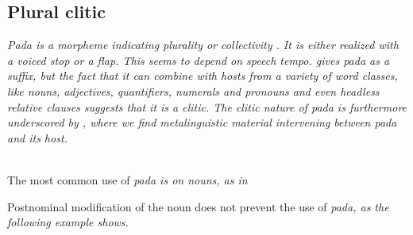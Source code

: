 \subsection{Plural clitic}\label{sec:morph:Pluralclitic}
\em Pada \em is a morpheme indicating plurality or collectivity . It is either realized with a voiced stop or a flap. This seems to depend on speech tempo.
\citet[14]{Ansaldo2005ms} gives \em pada \em as a suffix, but the fact that it can combine with hosts from a variety of word classes, like  nouns, adjectives, quantifiers, numerals and pronouns and even headless relative clauses suggests that it is a clitic. The clitic nature of \em pada \em is furthermore underscored by , where we find metalinguistic material intervening between \em pada \em and its host.

 \\ 

The most common use of \em pada \em is on nouns, as in 


Postnominal modification of the noun does not prevent the use of \em pada\em, as the following example shows.


% 

